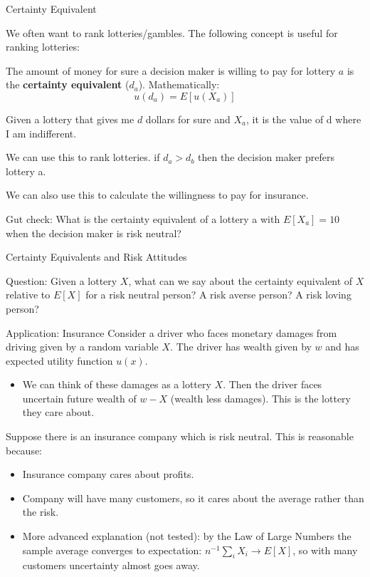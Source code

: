 \documentclass[aspectratio=169]{beamer}
\newenvironment{wideitemize}{\itemize\addtolength{\itemsep}{10pt}}{\enditemize}
\begin{document}
\begin{frame}{Certainty Equivalent}

\begin{wideitemize}
    \item We often want to rank lotteries/gambles. The following concept is useful for ranking lotteries:
    \begin{definition}
    The amount of money for sure a decision maker is willing to pay for lottery $a$ is the \textbf{certainty equivalent} ($d_a$). Mathematically:
    \[u(d_a) = E[u(X_a)]\]
    \end{definition}
    \item Given a lottery that gives me $d$ dollars for sure and $X_a$, it is the value of d where I am indifferent.
    \item We can use this to rank lotteries. if $d_a>d_b$ then the decision maker prefers lottery a.
    \item We can also use this to calculate the willingness to pay for insurance.
    \pause \item Gut check: What is the certainty equivalent of a lottery a with $E[X_a]=10$ when the decision maker is risk neutral?
\end{wideitemize}
\end{frame}

\begin{frame}{Certainty Equivalents and Risk Attitudes}

Question: Given a lottery $X$, what can we say about the certainty equivalent of $X$ relative to $E[X]$ for a risk neutral person? A risk averse person? A risk loving person?
    
\end{frame}

\begin{frame}{Application: Insurance}
Consider a driver who faces monetary damages from driving given by a random variable $X$. The driver has wealth given by $w$ and has expected utility function $u(x)$.
\begin{itemize}
    \item We can think of these damages as a lottery $X$. Then the driver faces uncertain future wealth of $w-X$ (wealth less damages). This is the lottery they care about.
\end{itemize}

Suppose there is an insurance company which is risk neutral. This is reasonable because:
\begin{itemize}
    \item Insurance company cares about profits.
    \item Company will have many customers, so it cares about the average rather than the risk.
    \item More advanced explanation (not tested): by the Law of Large Numbers the sample average converges to expectation: $n^{-1}\sum_i X_i \to E[X]$, so with many customers uncertainty almost goes away.
\end{itemize}
\end{frame}
\end{document}
